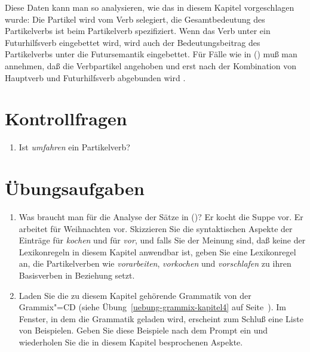 \noindent
Diese Daten kann man so analysieren, wie das in diesem Kapitel vorgeschlagen
wurde: Die Partikel wird vom Verb selegiert, die Gesamtbedeutung des Partikelverbs ist
beim Partikelverb spezifiziert. Wenn das Verb unter ein Futurhilfsverb eingebettet wird,
wird auch der Bedeutungsbeitrag des Partikelverbs unter die Futursemantik eingebettet.
Für Fälle wie in () muß man annehmen, daß die Verbpartikel angehoben und
erst nach der Kombination von Hauptverb und Futurhilfsverb abgebunden wird \citep[--30]{Mueller2005c}.
\section*{Kontrollfragen}


\begin{enumerate}
\item Ist \emph{umfahren} ein Partikelverb?
\end{enumerate}

\section*{Übungsaufgaben}

\begin{enumerate}
\item Was braucht man für die Analyse der Sätze in ()?
      \eal
      \ex Er kocht die Suppe vor.
      \ex Er arbeitet für Weihnachten vor.
      \zl
      Skizzieren Sie die syntaktischen Aspekte der Einträge für \emph{kochen} und für \emph{vor},
      und falls Sie der Meinung sind, daß keine der Lexikonregeln
      in diesem Kapitel anwendbar ist, geben Sie eine Lexikonregel
      an, die Partikelverben wie \emph{vorarbeiten}, \emph{vorkochen}
      und \emph{vorschlafen} zu ihren Basisverben in Beziehung setzt.

\item Laden Sie die zu diesem Kapitel gehörende Grammatik von der Grammix"=CD
(siehe Übung~\ref{uebung-grammix-kapitel4} auf Seite~\pageref{uebung-grammix-kapitel4}).
Im Fenster, in dem die Grammatik geladen wird, erscheint zum Schluß eine Liste von Beispielen.
Geben Sie diese Beispiele nach dem Prompt ein und wiederholen Sie die in diesem Kapitel besprochenen
Aspekte.

\end{enumerate}



\begin{comment}

Zurückgefallen sind das Saarland (von 7 auf 9) und Niedersachsen (von 8 auf 10)
jeweils um zwei Plätze. Jeweils um einen Platz zurück fielen Berlin (von 6 auf 7) und
Rheinland"=Pfalz (von 10 auf 11). c't 6/2005, S.\,102

\end{comment}



